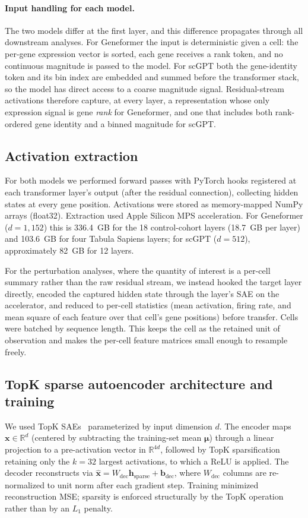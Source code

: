 \documentclass[onecolumn,11pt]{article}
\begin{document}
\paragraph{Input handling for each model.} The two models differ at the first layer, and this
difference propagates through all downstream analyses. For Geneformer the input is deterministic
given a cell: the per-gene expression vector is sorted, each gene receives a rank token, and no
continuous magnitude is passed to the model. For scGPT both the gene-identity token and its bin
index are embedded and summed before the transformer stack, so the model has direct access to a
coarse magnitude signal. Residual-stream activations therefore capture, at every layer, a
representation whose only expression signal is gene \emph{rank} for Geneformer, and one that
includes both rank-ordered gene identity and a binned magnitude for scGPT.

\subsection*{Activation extraction}

For both models we performed forward passes with PyTorch hooks registered at each transformer
layer's output (after the residual connection), collecting hidden states at every gene position.
Activations were stored as memory-mapped NumPy arrays (float32). Extraction used Apple Silicon MPS
acceleration. For Geneformer ($d{=}1{,}152$) this is 336.4~GB for the 18 control-cohort layers (18.7~GB per
layer) and 103.6~GB for four Tabula Sapiens layers; for scGPT ($d{=}512$), approximately 82~GB for
12 layers.

For the perturbation analyses, where the quantity of interest is a per-cell summary rather than the
raw residual stream, we instead hooked the target layer directly, encoded the captured hidden state
through the layer's SAE on the accelerator, and reduced to per-cell statistics (mean activation,
firing rate, and mean square of each feature over that cell's gene positions) before transfer.
Cells were batched by sequence length. This keeps the cell as the retained unit of observation and
makes the per-cell feature matrices small enough to resample freely.

\subsection*{TopK sparse autoencoder architecture and training}

We used TopK SAEs~\cite{makhzani2013ksparse} parameterized by input dimension $d$. The encoder maps
$\mathbf{x} \in \mathbb{R}^{d}$ (centered by subtracting the training-set mean $\boldsymbol{\mu}$)
through a linear projection to a pre-activation vector in $\mathbb{R}^{4d}$, followed by TopK
sparsification retaining only the $k{=}32$ largest activations, to which a ReLU is applied. The
decoder reconstructs via $\hat{\mathbf{x}} = W_\text{dec}\mathbf{h}_\text{sparse} +
\mathbf{b}_\text{dec}$, where $W_\text{dec}$ columns are re-normalized to unit norm after each
gradient step. Training minimized reconstruction MSE; sparsity is enforced structurally by the TopK
operation rather than by an $L_1$ penalty.
\end{document}

